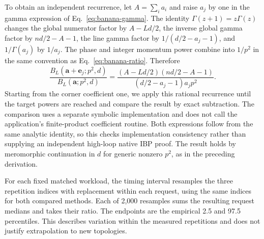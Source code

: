 To obtain an independent recurrence, let $A=\sum_i a_i$ and raise $a_j$ by one in the gamma expression of Eq.~\eqref{eq:banana-gamma}. The identity $\Gamma(z+1)=z\Gamma(z)$ changes the global numerator factor by $A-Ld/2$, the inverse global gamma factor by $nd/2-A-1$, the line gamma factor by $1/(d/2-a_j-1)$, and $1/\Gamma(a_j)$ by $1/a_j$. The phase and integer momentum power combine into $1/p^2$ in the same convention as Eq.~\eqref{eq:banana-ratio}. Therefore
\begin{equation}
 \frac{B_L(\boldsymbol a+\boldsymbol e_j;p^2,d)}{B_L(\boldsymbol a;p^2,d)}
 =\frac{(A-Ld/2)(nd/2-A-1)}{(d/2-a_j-1)a_jp^2}.
 \label{eq:extended-raising}
\end{equation}
Starting from the corner coefficient one, we apply this rational recurrence until the target powers are reached and compare the result by exact subtraction. The comparison uses a separate symbolic implementation and does not call the application's finite-product coefficient routine. Both expressions follow from the same analytic identity, so this checks implementation consistency rather than supplying an independent high-loop native IBP proof. The result holds by meromorphic continuation in $d$ for generic nonzero $p^2$, as in the preceding derivation.

For each fixed matched workload, the timing interval resamples the three repetition indices with replacement within each request, using the same indices for both compared methods. Each of 2,000 resamples sums the resulting request medians and takes their ratio. The endpoints are the empirical 2.5 and 97.5 percentiles. This describes variation within the measured repetitions and does not justify extrapolation to new topologies.

